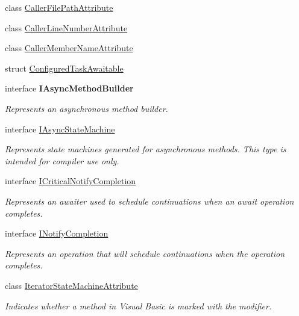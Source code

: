 \begin{DoxyCompactItemize}
class \hyperlink{class_system_1_1_runtime_1_1_compiler_services_1_1_caller_file_path_attribute}{Caller\+File\+Path\+Attribute}
\item 
class \hyperlink{class_system_1_1_runtime_1_1_compiler_services_1_1_caller_line_number_attribute}{Caller\+Line\+Number\+Attribute}
\item 
class \hyperlink{class_system_1_1_runtime_1_1_compiler_services_1_1_caller_member_name_attribute}{Caller\+Member\+Name\+Attribute}
\item 
struct \hyperlink{struct_system_1_1_runtime_1_1_compiler_services_1_1_configured_task_awaitable}{Configured\+Task\+Awaitable}
\item 
interface {\bfseries I\+Async\+Method\+Builder}
\begin{DoxyCompactList}\small\item\em Represents an asynchronous method builder.\end{DoxyCompactList}\item 
interface \hyperlink{interface_system_1_1_runtime_1_1_compiler_services_1_1_i_async_state_machine}{I\+Async\+State\+Machine}
\begin{DoxyCompactList}\small\item\em Represents state machines generated for asynchronous methods. This type is intended for compiler use only. \end{DoxyCompactList}\item 
interface \hyperlink{interface_system_1_1_runtime_1_1_compiler_services_1_1_i_critical_notify_completion}{I\+Critical\+Notify\+Completion}
\begin{DoxyCompactList}\small\item\em Represents an awaiter used to schedule continuations when an await operation completes. \end{DoxyCompactList}\item 
interface \hyperlink{interface_system_1_1_runtime_1_1_compiler_services_1_1_i_notify_completion}{I\+Notify\+Completion}
\begin{DoxyCompactList}\small\item\em Represents an operation that will schedule continuations when the operation completes. \end{DoxyCompactList}\item 
class \hyperlink{class_system_1_1_runtime_1_1_compiler_services_1_1_iterator_state_machine_attribute}{Iterator\+State\+Machine\+Attribute}
\begin{DoxyCompactList}\small\item\em Indicates whether a method in Visual Basic is marked with the  modifier. \end{DoxyCompactList}\item 

\end{DoxyCompactItemize}
